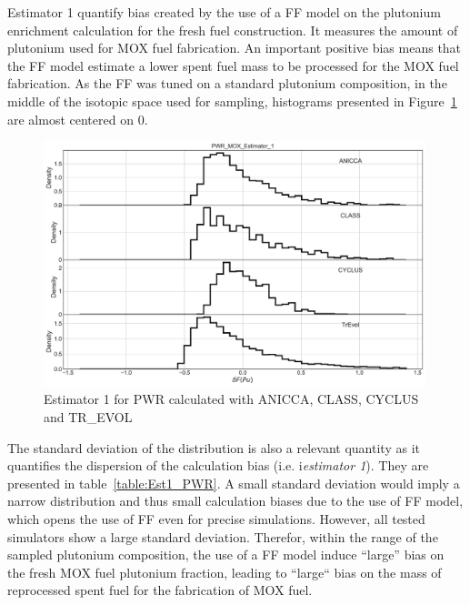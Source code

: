 Estimator 1 quantify bias created by the use of a \gls{FF} model on the plutonium enrichment calculation for the fresh fuel construction.
It measures the amount of plutonium used for \gls{MOX} fuel fabrication.
An important positive bias means that the \gls{FF} model estimate a lower spent fuel mass to be processed for the MOX fuel fabrication.
As the \gls{FF} was tuned on a standard plutonium composition, in the middle of the isotopic space used for sampling, histograms presented in Figure~\ref{fig:Est1_PWR} are almost centered on 0.

\begin{figure}[h]
	\begin{center}
		\includegraphics[width = 0.99\textwidth]{../../Feature_1/RAW_DATA/FIG/PWR_MOX_Estimator_1.pdf}
		\caption{Estimator 1 for \gls{PWR} calculated with ANICCA, CLASS, CYCLUS and TR\_EVOL}
		\label{fig:Est1_PWR}
	\end{center}
\end{figure}

The standard deviation of the distribution is also a relevant quantity as it quantifies the dispersion of the calculation bias (i.e. i\textit{estimator 1}).
They are presented in table~\ref{table:Est1_PWR}.
A small standard deviation would imply a narrow distribution and thus small calculation biases due to the use of \gls{FF} model, which opens the use of \gls{FF} even for precise simulations.
However, all tested simulators show a large standard deviation.
Therefor, within the range of the sampled plutonium composition, the use of a \gls{FF} model induce ``large'' bias on the fresh \gls{MOX} fuel plutonium fraction, leading to ``large`` bias on the mass of reprocessed spent fuel for the fabrication of \gls{MOX} fuel.


